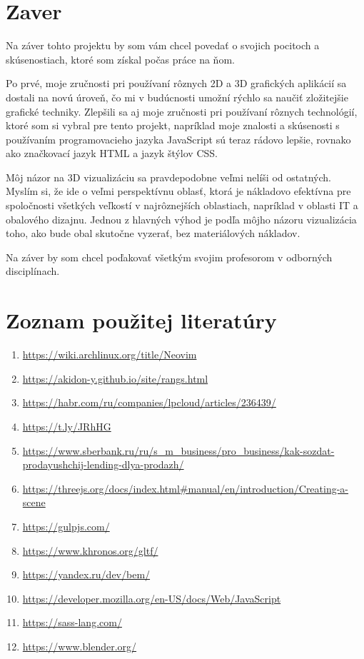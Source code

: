   \newpage
  \section{Zaver}
Na záver tohto projektu by som vám chcel povedať o svojich pocitoch a skúsenostiach, ktoré som získal počas práce na ňom.

Po prvé, moje zručnosti pri používaní rôznych 2D a 3D grafických aplikácií sa dostali na novú úroveň, čo mi v budúcnosti umožní rýchlo sa naučiť zložitejšie grafické techniky. Zlepšili sa aj moje zručnosti pri používaní rôznych technológií, ktoré som si vybral pre tento projekt, napríklad moje znalosti a skúsenosti s používaním programovacieho jazyka JavaScript sú teraz rádovo lepšie, rovnako ako značkovací jazyk HTML a jazyk štýlov CSS.

Môj názor na 3D vizualizáciu sa pravdepodobne veľmi nelíši od ostatných. Myslím si, že ide o veľmi perspektívnu oblasť, ktorá je nákladovo efektívna pre spoločnosti všetkých veľkostí v najrôznejších oblastiach, napríklad v oblasti IT a obalového dizajnu.  Jednou z hlavných výhod je podľa môjho názoru vizualizácia toho, ako bude obal skutočne vyzerať, bez materiálových nákladov.

Na záver by som chcel poďakovať všetkým svojim profesorom v odborných disciplínach.
  \newpage
  \section{Zoznam použitej literatúry}

    \begin{enumerate}
      \item{\url{https://wiki.archlinux.org/title/Neovim}}
      \item{\url{https://akidon-y.github.io/site/rangs.html}}
      \item{\url{https://habr.com/ru/companies/lpcloud/articles/236439/}}
      \item{\url{https://t.ly/JRhHG}}
      \item{\url{https://www.sberbank.ru/ru/s_m_business/pro_business/kak-sozdat-prodayushchij-lending-dlya-prodazh/}}
      \item{\url{https://threejs.org/docs/index.html#manual/en/introduction/Creating-a-scene}}
      \item{\url{https://gulpjs.com/}}
      \item{\url{https://www.khronos.org/gltf/}}
      \item{\url{https://yandex.ru/dev/bem/}}
      \item{\url{https://developer.mozilla.org/en-US/docs/Web/JavaScript}}
      \item{\url{https://sass-lang.com/}}
      \item{\url{https://www.blender.org/}}
    \end{enumerate}

